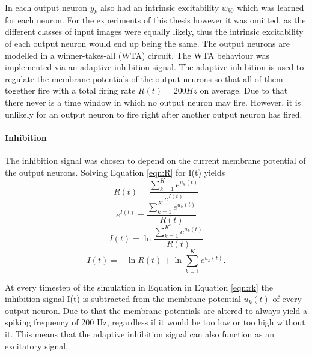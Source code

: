 In \citet{nessler} each output neuron $y_k$ also had an intrinsic excitability $w_{k0}$ which was learned for each neuron. For the experiments of this thesis however it was omitted, as the different classes of  input images were equally likely, thus the intrinsic excitability of each output neuron would end up being the same.
The output neurons are modelled in a winner-takes-all (WTA) circuit. The WTA behaviour was implemented via an adaptive inhibition signal. The adaptive inhibition is used to regulate
the membrane potentials of the output neurons so that all of them together fire with a total firing rate $R(t) = 200 Hz$ on average. Due to that there never is a time window in which no output neuron may fire. However, it is unlikely for an output neuron to fire right after another output neuron has fired.

\paragraph{Inhibition}
The inhibition signal was chosen to depend on the current membrane potential of the output neurons. 
Solving Equation \ref{eqn:R} for I(t) yields
\begin{equation}
\label{}
R(t) = \frac{ \sum_{k=1}^K e^{u_k(t)}}{e^{I(t)}}
\end{equation}
\begin{equation}
\label{}
e^{I(t)} = \frac{\sum_{k=1}^K e^{u_k(t)}}{R(t)}
\end{equation}
\begin{equation}
\label{}
I(t) = \ln{ \frac{ \sum_{k=1}^K e^{u_k(t)}}{R(t)}}
\end{equation}
\begin{equation}
\label{eqn:I(t)}
I(t) =  - \ln{R(t)} + \ln{  \sum_{k=1}^K e^{u_k(t)}}.
\end{equation}

At every timestep of the simulation in Equation in Equation \ref{eqn:rk} the inhibition signal I(t) is subtracted from the membrane potential $u_k(t)$ of every output neuron. Due to that the membrane potentials are altered to always yield a spiking frequency of 200 Hz, regardless if it would be too low or too high without it. This means that the adaptive inhibition signal can also function as an excitatory signal. 

